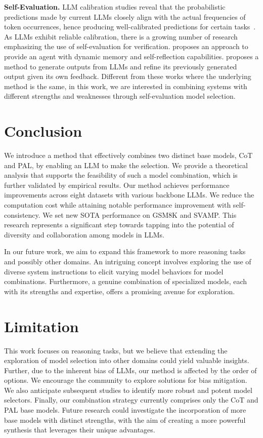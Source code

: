 \documentclass[11pt]{article}
\begin{document}
\textbf{Self-Evaluation.}
LLM calibration studies reveal that the probabilistic predictions made by current LLMs closely align with the actual frequencies of token occurrences, hence producing well-calibrated predictions for certain tasks~\citep{Guo2017OnCO, Kadavath2022LanguageM, Jiang2020HowCW}. 
As LLMs exhibit reliable calibration, there is a growing number of research emphasizing the use of self-evaluation for verification. \citet{Shinn2023ReflexionAA} proposes an approach to provide an agent with dynamic memory and self-reflection capabilities. \citet{Madaan2023SelfRefineIR} proposes a method to generate outputs from LLMs and refine its previously generated output given its own feedback. Different from these works where the underlying method is the same, in this work, we are interested in combining systems with different strengths and weaknesses through self-evaluation model selection.

\section{Conclusion}
We introduce a method that effectively combines two distinct base models, CoT and PAL, by enabling an LLM to make the selection. We provide a theoretical analysis that supports the feasibility of such a model combination, which is further validated by empirical results. Our method achieves performance improvements across eight datasets with various backbone LLMs. We reduce the computation cost while attaining notable performance improvement with self-consistency. We set new SOTA performance on GSM8K and SVAMP. This research represents a significant step towards tapping into the potential of diversity and collaboration among models in LLMs.

In our future work, we aim to expand this framework to more reasoning tasks and possibly other domains. An intriguing concept involves exploring the use of diverse system instructions to elicit varying model behaviors for model combinations. Furthermore, a genuine combination of specialized models, each with its strengths and expertise, offers a promising avenue for exploration.

\section{Limitation}
This work focuses on reasoning tasks, but we believe that extending the exploration of model selection into other domains could yield valuable insights. Further, due to the inherent bias of LLMs, our method is affected by the order of options. We encourage the community to explore solutions for bias mitigation. We also anticipate subsequent studies to identify more robust and potent model selectors. Finally, our combination strategy currently comprises only the CoT and PAL base models. Future research could investigate the incorporation of more base models with distinct strengths, with the aim of creating a more powerful synthesis that leverages their unique advantages.
\end{document}
